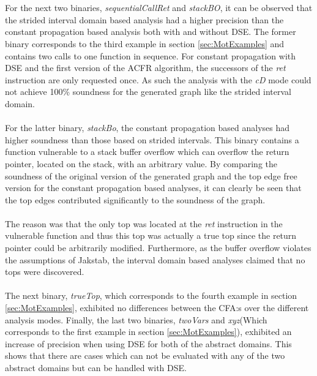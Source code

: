 \documentclass{kththesis}
\renewcommand{\it}[1]{\textit{#1}}
\begin{document}
\\ \\
For the next two binaries, \it{sequentialCallRet} and \it{stackBO}, it can be observed that the strided interval domain based analysis had a higher precision than the constant propagation based analysis both with and without DSE. The former binary corresponds to the third example in section \ref{sec:MotExamples} and contains two calls to one function in sequence. For constant propagation with DSE and the first version of the ACFR algorithm, the successors of the \it{ret} instruction are only requested once. As such the analysis with the \it{cD} mode could not achieve 100\% soundness for the generated graph like the strided interval domain.
\\ \\
For the latter binary, \it{stackBo}, the constant propagation based analyses had higher soundness than those based on strided intervals. This binary contains a function vulnerable to a stack buffer overflow which can overflow the return pointer, located on the stack, with an arbitrary value. By comparing the soundness of the original version of the generated graph and the top edge free version for the constant propagation based analyses, it can clearly be seen that the top edges contributed significantly to the soundness of the graph. 
\\ \\
The reason was that the only top was located at the \it{ret} instruction in the vulnerable function and thus this top was actually a true top since the return pointer could be arbitrarily modified. Furthermore, as the buffer overflow violates the assumptions of Jakstab, the interval domain based analyses claimed that no tops were discovered. %
\\ \\
The next binary, \it{trueTop}, which corresponds to the fourth example in section \ref{sec:MotExamples}, exhibited no differences between the CFA:s over the different analysis modes. Finally, the last two binaries, \it{twoVars} and \it{xyz}(Which corresponds to the first example in section \ref{sec:MotExamples}), exhibited an increase of precision when using DSE for both of the abstract domains. This shows that there are cases which can not be evaluated with any of the two abstract domains but can be handled with DSE.
\end{document}
